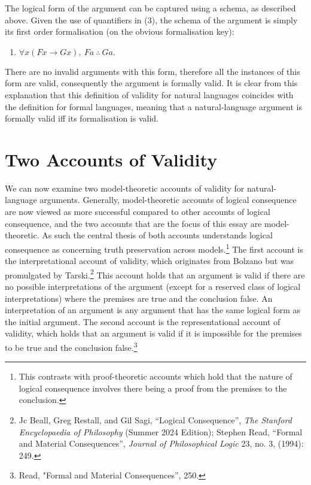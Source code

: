 \noindent The logical form of the argument can be captured using a schema, as
described above. Given the use of quantifiers in (3), the schema of the
argument is simply its first order formalisation (on the obvious
formalisation key):

\begin{enumerate}[leftmargin=42] 

\def\labelenumi{(\arabic{enumi})}
\setcounter{enumi}{3}
\item
  $ \forall x(Fx \rightarrow Gx), \ Fa \ \therefore \ Ga.$
\end{enumerate} 

\noindent There are no invalid arguments with this form, therefore all the
instances of this form are valid, consequently the argument is formally
valid. It is clear from this explanation that this definition of
validity for natural languages coincides with the definition for formal
languages, meaning that a natural-language argument is formally valid
iff its formalisation is valid.

\section*{Two Accounts of Validity}

We can now examine two model-theoretic accounts of validity for
natural-language arguments. Generally, model-theoretic accounts of
logical consequence are now viewed as more successful compared to other
accounts of logical consequence, and the two accounts that are the focus
of this essay are model-theoretic. As such the central thesis of both
accounts understands logical consequence as concerning truth
preservation across models.\footnote{This contrasts with proof-theoretic
  accounts which hold that the nature of logical consequence involves
  there being a proof from the premises to the conclusion.} The first
account is the interpretational account of validity, which originates
from Bolzano but was promulgated by Tarski.\footnote{Jc Beall, Greg
  Restall, and Gil Sagi, ``Logical Consequence'', \emph{The Stanford
  Encyclopaedia of Philosophy} (Summer 2024 Edition); Stephen Read,
  ``Formal and Material Consequences'', \emph{Journal of Philosophical
  Logic} 23, no. 3, (1994): 249.} This account holds that an argument is
valid if there are no possible interpretations of the argument (except
for a reserved class of logical interpretations) where the premises are
true and the conclusion false. An interpretation of an argument is any
argument that has the same logical form as the initial argument. The
second account is the representational account of validity, which holds
that an argument is valid if it is impossible for the premises to be
true and the conclusion false.\footnote{Read, "Formal and Material
  Consequences'', 250.}

